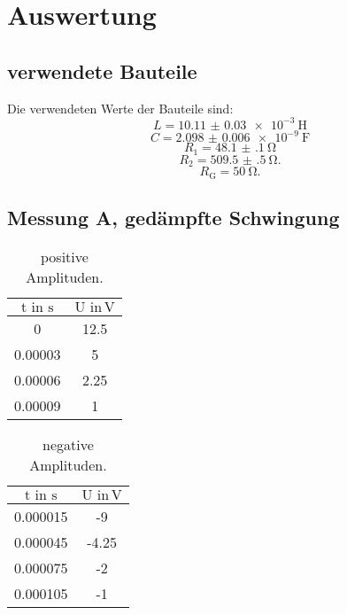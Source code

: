 \section{Auswertung}
\label{sec:Auswertung}

\subsection{verwendete Bauteile}

Die verwendeten Werte der Bauteile sind:
\begin{equation*}
  L = \SI{10.11(3)e-3}{\henry}
\end{equation*}
\begin{equation*}
  C = \SI{2.098(6)e-9}{\farad}
\end{equation*}
\begin{equation*}
  R_{\text{1}} = \SI{48.1(1)}{\ohm}
\end{equation*}
\begin{equation*}
  R_{\text{2}} = \SI{509.5(5)}{\ohm}.
\end{equation*}
\begin{equation*}
  R_{\text{G}} = \SI{50}{\ohm}.
\end{equation*}

\subsection{Messung A, gedämpfte Schwingung}

\begin{table}[h]
  \centering
  \label{tab:posA}
  \begin{tabular}{ c c }
    \toprule
    {$\text{t} \,\, \text{in} \,\,\si{\second}$}
   &{$\text{U} \,\, \text{in} \,\si{\volt}$} \\

    \midrule
    0       & 12.5 \\
    0.00003 &  5   \\
    0.00006 &  2.25\\
    0.00009 &  1   \\
    \bottomrule
  \end{tabular}
  \caption{positive Amplituden.}
\end{table}

\begin{table}[h]
  \centering
  \label{tab:negA}
  \begin{tabular}{ c c }
    \toprule
    {$\text{t} \,\, \text{in} \,\,\si{\second}$}
   &{$\text{U} \,\, \text{in} \,\si{\volt}$} \\

    \midrule
    0.000015 & -9   \\
    0.000045 & -4.25\\
    0.000075 & -2   \\
    0.000105 & -1   \\
    \bottomrule
  \end{tabular}
  \caption{negative Amplituden.}
\end{table}

